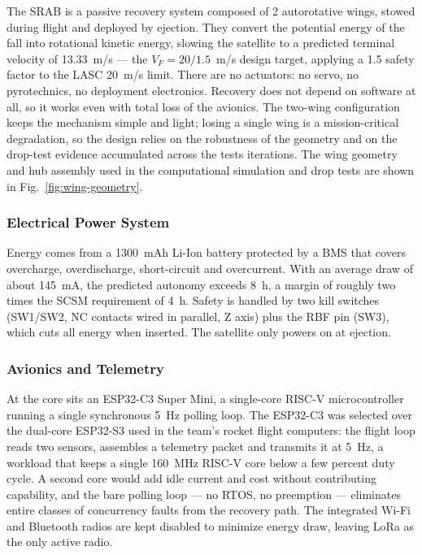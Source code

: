 The SRAB is a passive recovery system composed of 2 autorotative wings,
stowed during flight and deployed by ejection. They
convert the potential energy of the fall into rotational kinetic
energy, slowing the satellite to a predicted terminal velocity of
13.33~m/s --- the $V_F = 20/1.5$~m/s design target, applying a 1.5
safety factor to the LASC 20~m/s limit. There are no actuators: no
servo, no pyrotechnics, no deployment electronics. Recovery does not
depend on software at all, so it works even with total loss of the
avionics. The two-wing configuration keeps the mechanism simple and
light; losing a single wing is a mission-critical degradation, so the
design relies on the robustness of the geometry and on the drop-test
evidence accumulated across the tests iterations. The wing geometry
and hub assembly used in the computational simulation and drop tests
are shown in Fig.~\ref{fig:wing-geometry}.

\subsubsection{Electrical Power System}

Energy comes from a 1300~mAh Li-Ion battery protected by a BMS that
covers overcharge, overdischarge, short-circuit and overcurrent. With
an average draw of about 145~mA, the predicted autonomy exceeds 8~h, a
margin of roughly two times the SCSM requirement of 4~h. Safety is
handled by two kill switches (SW1/SW2, NC contacts wired in parallel,
Z axis) plus the RBF pin
(SW3), which cuts all energy when inserted. The satellite only powers
on at ejection.

\subsubsection{Avionics and Telemetry}

At the core sits an ESP32-C3 Super Mini, a single-core RISC-V
microcontroller running a single synchronous 5~Hz polling loop. The
ESP32-C3 was selected over the dual-core ESP32-S3 used in the team's
rocket flight computers: the flight loop reads two sensors, assembles
a telemetry packet and transmits it at 5~Hz, a workload that keeps a
single 160~MHz RISC-V core below a few percent duty cycle. A second
core would add idle current and cost without contributing capability,
and the bare polling loop --- no RTOS, no preemption --- eliminates
entire classes of concurrency faults from the recovery path. The
integrated Wi-Fi and Bluetooth radios are kept disabled to minimize
energy draw, leaving LoRa as the only active radio.

